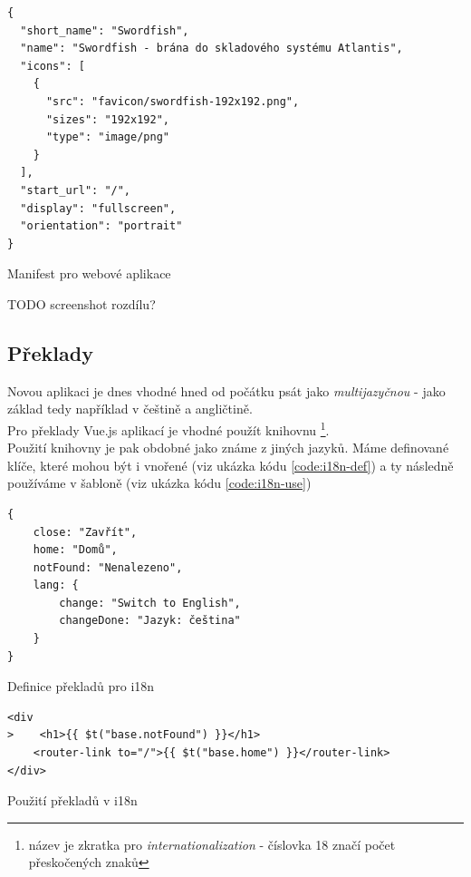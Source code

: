 \begin{listing}[H]
\begin{verbatim}
{
  "short_name": "Swordfish",
  "name": "Swordfish - brána do skladového systému Atlantis",
  "icons": [
    {
      "src": "favicon/swordfish-192x192.png",
      "sizes": "192x192",
      "type": "image/png"
    }
  ],
  "start_url": "/",
  "display": "fullscreen",
  "orientation": "portrait"
}
\end{verbatim}
\caption{Manifest pro webové aplikace} \label{code:webapp-manifest}
\end{listing}

TODO screenshot rozdílu?


\subsection{Překlady}

Novou aplikaci je dnes vhodné hned od počátku psát jako \emph{multijazyčnou} - jako základ tedy například v češtině a angličtině.\\
Pro překlady Vue.js aplikací je vhodné použít knihovnu \footnote{název je zkratka pro \emph{internationalization} - číslovka 18 značí počet přeskočených znaků}. \cite{vue-i18n}\\
Použití knihovny je pak obdobné jako známe z jiných jazyků. Máme definované klíče, které mohou být i vnořené (viz ukázka kódu \ref{code:i18n-def}) a ty následně používáme v šabloně (viz ukázka kódu \ref{code:i18n-use})
\begin{listing}[h]
\begin{verbatim}
{
    close: "Zavřít",
    home: "Domů",
    notFound: "Nenalezeno",
    lang: {
        change: "Switch to English",
        changeDone: "Jazyk: čeština"
    }
}
\end{verbatim}
\caption{Definice překladů pro i18n} \label{code:i18n-def}
\end{listing}

\begin{listing}[h]
\begin{verbatim}
<div
>    <h1>{{ $t("base.notFound") }}</h1>
    <router-link to="/">{{ $t("base.home") }}</router-link>
</div>
\end{verbatim}
\caption{Použití překladů v i18n} \label{code:i18n-use}
\end{listing}

